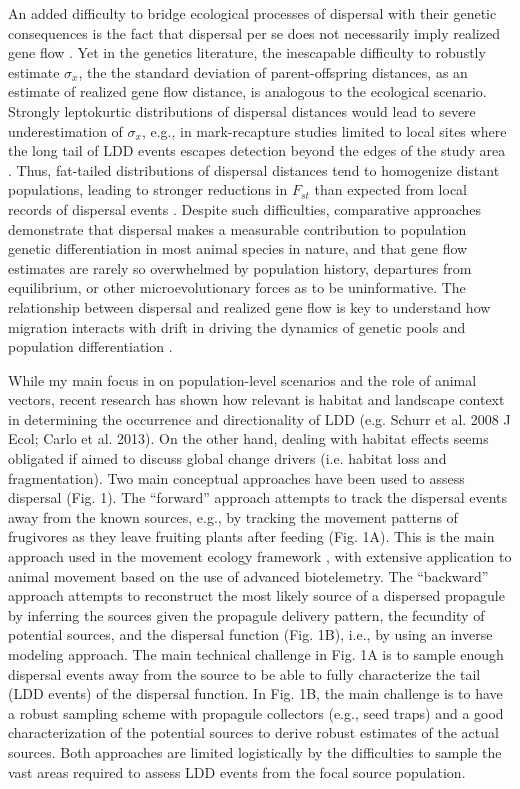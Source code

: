 \documentclass[a4paper, 12pt]{article}
\begin{document}
\begin{linenumbers}
An added difficulty to bridge ecological processes of dispersal with their genetic consequences is the fact that dispersal per se does not necessarily imply realized gene flow \citep{Mallet:2001wx}. Yet in the genetics literature, the inescapable difficulty to robustly estimate $\sigma_x$, the the standard deviation of parent-offspring distances, as an estimate of realized gene flow distance, is analogous to the ecological scenario. Strongly leptokurtic distributions of dispersal distances would lead to severe underestimation of $\sigma_x$, e.g., in mark-recapture studies limited to local sites where the long tail of LDD events escapes detection beyond the edges of the study area \citep{Mallet:2001wx}. Thus, fat-tailed distributions of dispersal distances tend to homogenize distant populations, leading to stronger reductions in $F_{st}$ than expected from local records of dispersal events \citep{Rousset:1997bd}. Despite such difficulties, comparative approaches \citep[e.g.,][]{Bohonak:1999aa} demonstrate that dispersal makes a measurable contribution to population genetic differentiation in most animal species in nature, and that gene flow estimates are rarely so overwhelmed by population history, departures from equilibrium, or other microevolutionary forces as to be uninformative. The relationship between dispersal and realized gene flow is key to understand how migration interacts with drift in driving the dynamics of genetic pools and population differentiation \citep{Garant:2007cka}. 

While my main focus in on population-level scenarios and the role of animal vectors, recent research has shown how relevant is habitat and landscape context in determining the occurrence and directionality of LDD (e.g. Schurr et al. 2008 J Ecol; Carlo et al. 2013). On the other hand, dealing with habitat effects seems obligated if aimed to discuss global change drivers (i.e. habitat loss and fragmentation). Two main conceptual approaches have been used to assess dispersal (Fig. 1). The “forward” approach attempts to track the dispersal events away from the known sources, e.g., by tracking the movement patterns of frugivores as they leave fruiting plants after feeding (Fig. 1A). This is the main approach used in the movement ecology framework \citep{Nathan:2008fx}, with extensive application to animal movement based on the use of advanced biotelemetry. The “backward” approach attempts to reconstruct the most likely source of a dispersed propagule by inferring the sources given the propagule delivery pattern, the fecundity of potential sources, and the dispersal function (Fig. 1B), i.e., by using an inverse modeling approach. The main technical challenge in Fig. 1A is to sample enough dispersal events away from the source to be able to fully characterize the tail (LDD events) of the dispersal function. In Fig. 1B, the main challenge is to have a robust sampling scheme with propagule collectors (e.g., seed traps) and a good characterization of the potential sources to derive robust estimates of the actual sources. Both approaches are limited logistically by the difficulties to sample the vast areas required to assess LDD events from the focal source population.   


\end{linenumbers}
\end{document}
